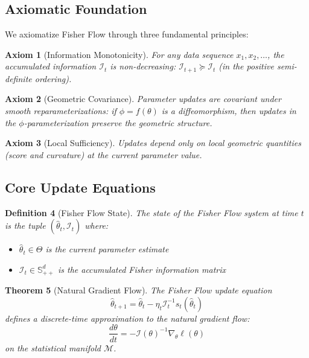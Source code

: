 \documentclass[11pt]{article}
\newtheorem{theorem}{Theorem}
\newtheorem{definition}[theorem]{Definition}
\newtheorem{axiom}[theorem]{Axiom}
\begin{document}
\subsection{Axiomatic Foundation}

We axiomatize Fisher Flow through three fundamental principles:

\begin{axiom}[Information Monotonicity]
For any data sequence $x_1, x_2, \ldots$, the accumulated information $\mathcal{I}_t$ is non-decreasing: $\mathcal{I}_{t+1} \succeq \mathcal{I}_t$ (in the positive semi-definite ordering).
\end{axiom}

\begin{axiom}[Geometric Covariance]
Parameter updates are covariant under smooth reparameterizations: if $\phi = f(\theta)$ is a diffeomorphism, then updates in the $\phi$-parameterization preserve the geometric structure.
\end{axiom}

\begin{axiom}[Local Sufficiency]
Updates depend only on local geometric quantities (score and curvature) at the current parameter value.
\end{axiom}

\subsection{Core Update Equations}

\begin{definition}[Fisher Flow State]
The state of the Fisher Flow system at time $t$ is the tuple $(\hat{\theta}_t, \mathcal{I}_t)$ where:
\begin{itemize}
\item $\hat{\theta}_t \in \Theta$ is the current parameter estimate
\item $\mathcal{I}_t \in \mathbb{S}^d_{++}$ is the accumulated Fisher information matrix
\end{itemize}
\end{definition}

\begin{theorem}[Natural Gradient Flow]
\label{thm:natural_gradient}
The Fisher Flow update equation
\begin{equation}
\hat{\theta}_{t+1} = \hat{\theta}_t - \eta_t \mathcal{I}_t^{-1} s_t(\hat{\theta}_t)
\end{equation}
defines a discrete-time approximation to the natural gradient flow:
\begin{equation}
\frac{d\theta}{dt} = -\mathcal{I}(\theta)^{-1} \nabla_\theta \ell(\theta)
\end{equation}
on the statistical manifold $\mathcal{M}$.
\end{theorem}
\end{document}
